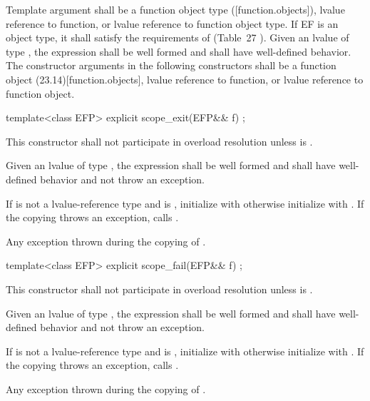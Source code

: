 \documentclass[ebook,11pt,article]{memoir}
\begin{document}
\pnum
\requires
Template argument  shall be a function object type ([function.objects]), 
lvalue reference to function, or 
lvalue reference to function object type.
If EF is an object type, it  shall satisfy
the requirements of  (Table~27
). 
Given an lvalue  of type , the expression  shall be well formed and shall have well-defined behavior.
The constructor arguments  in the following constructors shall be a function object (23.14)[function.objects], 
lvalue reference to function, or 
lvalue reference to function object.


\begin{itemdecl}
template<class EFP>
explicit
scope_exit(EFP&& f) ;
\end{itemdecl}

\begin{itemdescr}
\remarks This constructor shall not participate in overload resolution unless  is .

\pnum
\requires Given an lvalue  of type , the expression  shall be well formed and shall have well-defined behavior and not throw an exception.


\pnum
\effects If  is not a lvalue-reference type and  is , initialize   with  otherwise initialize  with . If the copying throws an exception, calls .

\pnum
\throws Any exception thrown during the copying of .

\end{itemdescr}


\begin{itemdecl}
template<class EFP>
explicit
scope_fail(EFP&& f) ;
\end{itemdecl}

\begin{itemdescr}
\pnum
\remarks This constructor shall not participate in overload resolution unless  is .

\pnum
\requires Given an lvalue  of type , the expression  shall be well formed and shall have well-defined behavior and not throw an exception.

\pnum
\effects If  is not a lvalue-reference type and  is , initialize   with  otherwise initialize  with . If the copying throws an exception, calls .

\pnum
\throws Any exception thrown during the copying of .

\end{itemdescr}
\end{document}
